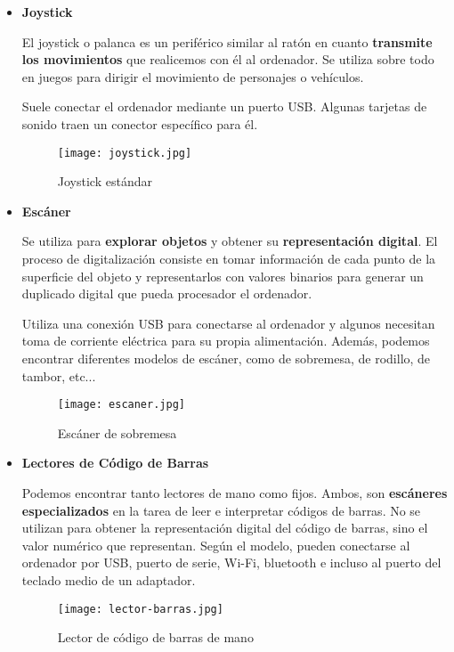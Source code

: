 \begin{itemize}
    \item \textbf{Joystick}

    El joystick o palanca es un periférico similar al ratón en cuanto \textbf{transmite los movimientos} que realicemos con él al ordenador. Se  utiliza sobre todo en juegos para dirigir el movimiento de personajes o vehículos.

    Suele conectar el ordenador mediante un puerto USB. Algunas tarjetas de sonido traen un conector específico para él.

    \begin{figure}[ht]
        \centering
        \texttt{[image: joystick.jpg]}
        \caption{Joystick estándar}
    \end{figure}

    \item \textbf{Escáner}

    Se utiliza para \textbf{explorar objetos} y obtener su \textbf{representación digital}. El proceso de digitalización consiste en tomar información de cada punto de la superficie del objeto y representarlos con valores binarios para generar un duplicado digital que pueda procesador el ordenador.

    Utiliza una conexión USB para conectarse al ordenador y algunos necesitan toma de corriente eléctrica para su propia alimentación. Además, podemos encontrar diferentes modelos de escáner,  como de sobremesa, de rodillo, de tambor, etc...

    \begin{figure}[ht]
        \centering
        \texttt{[image: escaner.jpg]}
        \caption{Escáner de sobremesa}
    \end{figure}

    \item \textbf{Lectores de Código de Barras}

    Podemos encontrar tanto lectores de mano como fijos. Ambos, son \textbf{escáneres especializados} en la tarea de leer e interpretar códigos de barras. No se utilizan para obtener la representación digital del código de barras, sino el valor numérico que representan. Según el modelo, pueden conectarse al ordenador por USB, puerto de serie, Wi-Fi, bluetooth e incluso al puerto del teclado medio de un adaptador.

     \begin{figure}[ht]
        \centering
        \texttt{[image: lector-barras.jpg]}
        \caption{Lector de código de barras de mano}
    \end{figure}


\end{itemize}
